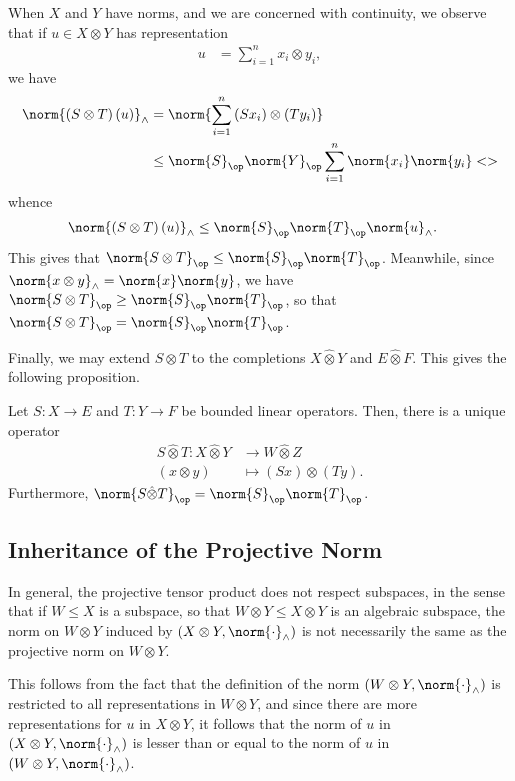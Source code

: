\documentclass[10pt]{mypackage}
\begin{document}
When $X$ and $Y$ have norms, and we are concerned with continuity, we observe that if $u\in X\otimes Y$ has representation
\begin{align*}
  u &= \sum_{i=1}^{n}x_i\otimes y_i,
\end{align*}
we have
\begin{align*}
  \norm{\left( S\otimes T \right)\left( u \right)}_{\wedge} &= \norm{\sum_{i=1}^{n}\left( Sx_i \right)\otimes \left( Ty_i \right)}\\
                                                   &\leq \norm{S}_{\op}\norm{Y}_{\op}\sum_{i=1}^{n}\norm{x_i}\norm{y_i}<>
\end{align*}
whence
\begin{align*}
  \norm{\left( S\otimes T \right)\left( u \right)}_{\wedge} &\leq \norm{S}_{\op}\norm{T}_{\op}\norm{u}_{\wedge}.
\end{align*}
This gives that $\norm{S\otimes T}_{\op}\leq \norm{S}_{\op}\norm{T}_{\op}$. Meanwhile, since $\norm{x\otimes y}_{\wedge} = \norm{x}\norm{y}$, we have $\norm{S\otimes T}_{\op}\geq \norm{S}_{\op}\norm{T}_{\op}$, so that $\norm{S\otimes T}_{\op} = \norm{S}_{\op}\norm{T}_{\op}$.

Finally, we may extend $S\otimes T$ to the completions $X\hat{\otimes}Y$ and $E\hat{\otimes}F$. This gives the following proposition.
\begin{proposition}
  Let $S\colon X\rightarrow E$ and $T\colon Y\rightarrow F$ be bounded linear operators. Then, there is a unique operator 
  \begin{align*}
    S\hat\otimes T\colon X\hat\otimes Y&\rightarrow W\hat\otimes Z\\
    \left( x\otimes y \right) &\mapsto \left( Sx \right)\otimes \left( Ty \right).
  \end{align*}
  Furthermore, $\norm{S\hat\otimes T}_{\op} = \norm{S}_{\op}\norm{T}_{\op}$.
\end{proposition}
\subsection{Inheritance of the Projective Norm}%
In general, the projective tensor product does not respect subspaces, in the sense that if $W\leq X$ is a subspace, so that $W\otimes Y\leq X\otimes Y$ is an algebraic subspace, the norm on $W\otimes Y$ induced by $\left( X\otimes Y,\norm{\cdot}_{\wedge} \right)$ is not necessarily the same as the projective norm on $W\otimes Y$.

This follows from the fact that the definition of the norm $\left( W\otimes Y,\norm{\cdot}_{\wedge} \right)$ is restricted to all representations in $W\otimes Y$, and since there are more representations for $u$ in $X\otimes Y$, it follows that the norm of $u$ in $\left( X\otimes Y,\norm{\cdot}_{\wedge} \right)$ is lesser than or equal to the norm of $u$ in $\left( W\otimes Y,\norm{\cdot}_{\wedge} \right)$.
\end{document}
